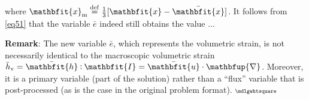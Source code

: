 \documentclass[12pt,a4paper]{article}
\renewcommand{\ta}[1]{\mathbfit{#1}}
\renewcommand{\ts}[1]{\mathbfit{#1}}
\renewcommand{\diff}{\mathbfup{\nabla}}
\renewcommand{\Box}{\mdlgwhtsquare}
\DeclarePairedDelimiter{\jmp}{[\![}{]\!]}
\renewcommand{\dev}{\mathrm{d}}
\renewcommand{\vol}{\mathrm{v}}
\newcommand{\volume}{|\Omega_\rve|}
\newcommand{\rve}{
  {\mathchoice
   {\mbox{\scalebox{0.67}{$\Box$}}}
   {\mbox{\scalebox{0.67}{$\Box$}}}
   {\mbox{\scalebox{0.5}{$\Box$}}}
   {\mbox{\scalebox{0.375}{$\Box$}}}
  }
}
\begin{document}
where $\ta{x}_\mean\defeq\frac{1}{3}[\ta{x}-\bar{\ta{x}}]$.
It follows from \cref{eq51} that the variable $\bar{e}$ indeed still obtains the value $...$

\textbf{Remark}: The new variable $\bar{e}$, which represents the volumetric strain, is not necessarily identical to the macroscopic volumetric strain $\bar{h}_\vol=\bar{\ts{h}}\dprod\ts{I}=\bar{\ta{u}}\cdot\diff$.
Moreover, it is a primary variable (part of the solution) rather than a ``flux'' variable that is post-processed (as is the case in the original problem format). $\rve$

\end{document}
